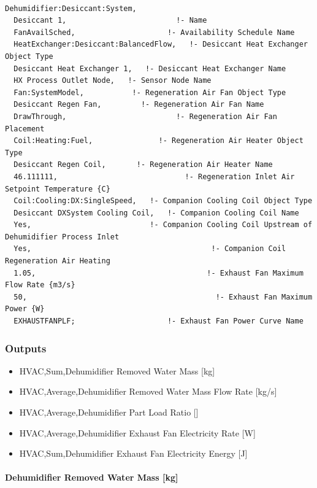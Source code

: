 \begin{lstlisting}

Dehumidifier:Desiccant:System,
  Desiccant 1,                         !- Name
  FanAvailSched,                     !- Availability Schedule Name
  HeatExchanger:Desiccant:BalancedFlow,   !- Desiccant Heat Exchanger Object Type
  Desiccant Heat Exchanger 1,   !- Desiccant Heat Exchanger Name
  HX Process Outlet Node,   !- Sensor Node Name
  Fan:SystemModel,           !- Regeneration Air Fan Object Type
  Desiccant Regen Fan,         !- Regeneration Air Fan Name
  DrawThrough,                         !- Regeneration Air Fan Placement
  Coil:Heating:Fuel,               !- Regeneration Air Heater Object Type
  Desiccant Regen Coil,       !- Regeneration Air Heater Name
  46.111111,                             !- Regeneration Inlet Air Setpoint Temperature {C}
  Coil:Cooling:DX:SingleSpeed,   !- Companion Cooling Coil Object Type
  Desiccant DXSystem Cooling Coil,   !- Companion Cooling Coil Name
  Yes,                           !- Companion Cooling Coil Upstream of Dehumidifier Process Inlet
  Yes,                                         !- Companion Coil Regeneration Air Heating
  1.05,                                       !- Exhaust Fan Maximum Flow Rate {m3/s}
  50,                                           !- Exhaust Fan Maximum Power {W}
  EXHAUSTFANPLF;                     !- Exhaust Fan Power Curve Name
\end{lstlisting}

\subsubsection{Outputs}\label{outputs-1-006}

\begin{itemize}
\item
  HVAC,Sum,Dehumidifier Removed Water Mass {[}kg{]}
\item
  HVAC,Average,Dehumidifier Removed Water Mass Flow Rate {[}kg/s{]}
\item
  HVAC,Average,Dehumidifier Part Load Ratio {[]}
\item
  HVAC,Average,Dehumidifier Exhaust Fan Electricity Rate {[}W{]}
\item
  HVAC,Sum,Dehumidifier Exhaust Fan Electricity Energy {[}J{]}
\end{itemize}

\paragraph{Dehumidifier Removed Water Mass {[}kg{]}}\label{dehumidifier-removed-water-mass-kg-1}

